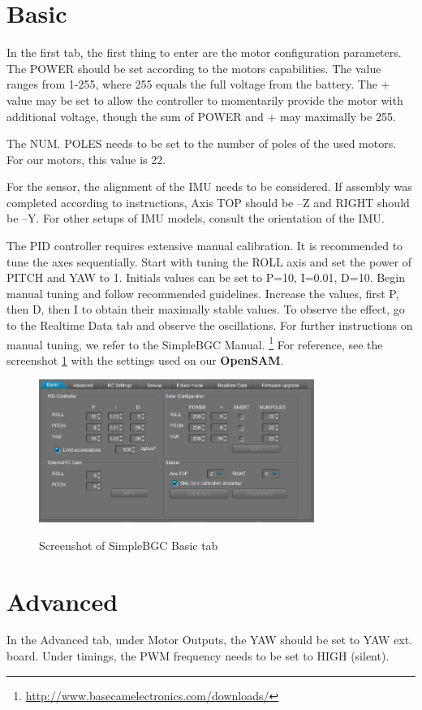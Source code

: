 \section{Basic}
In the first tab, the first thing to enter are the motor configuration parameters. The POWER should be set according to the motors capabilities. The value ranges from 1-255, where 255 equals the full voltage from the battery. The + value may be set to allow the controller to momentarily provide the motor with additional voltage, though the sum of POWER and + may maximally be 255.\par
The NUM. POLES needs to be set to the number of poles of the used motors. For our motors, this value is 22.\par
For the sensor, the alignment of the IMU needs to be considered. If assembly was completed according to instructions, Axis TOP should be –Z and RIGHT should be –Y. For other setups of IMU models, consult the orientation of the IMU.\par
The PID controller requires extensive manual calibration. It is recommended to tune the axes sequentially. Start with tuning the ROLL axis and set the power of PITCH and YAW to 1. Initials values can be set to P=10, I=0.01, D=10. Begin manual tuning and follow recommended guidelines. Increase the values, first P, then D, then I to obtain their maximally stable values. To observe the effect, go to the Realtime Data tab and observe the oscillations. For further instructions on manual tuning, we refer to the SimpleBGC Manual. \footnote{\url{http://www.basecamelectronics.com/downloads/}}
For reference, see the screenshot \ref{SRNSHOT:BGCMain} with the settings used on our \textbf{\textsf{OpenSAM}}.
\begin{figure}[!h]
    \centering
    \includegraphics[width=0.8\textwidth]{BGCSetup/SimpleBGCMain.PNG}
    \label{SRNSHOT:BGCMain}
    \caption{Screenshot of SimpleBGC Basic tab}
\end{figure}

\section{Advanced}
In the Advanced tab, under Motor Outputs, the YAW should be set to YAW ext. board. Under timings, the PWM frequency needs to be set to HIGH (silent).

